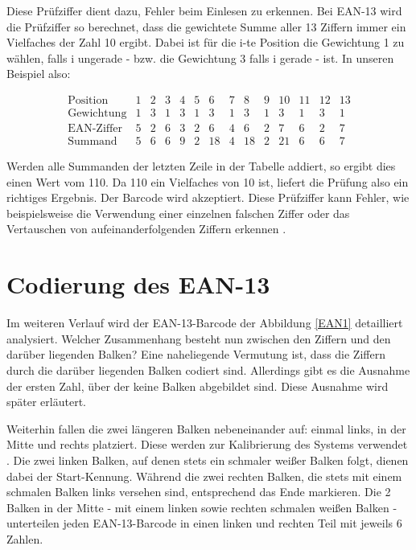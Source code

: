 Diese Prüfziffer dient dazu, Fehler beim Einlesen zu erkennen. 
Bei EAN-13 wird die Prüfziffer so berechnet, 
dass die gewichtete Summe aller 13 Ziffern immer ein Vielfaches der Zahl 10 ergibt.
Dabei ist für die i-te Position die Gewichtung 1 zu wählen, falls i ungerade - bzw. die Gewichtung 3 falls i gerade - ist. 
In unseren Beispiel also:

\[
\begin{array}{l|r|r|r|r|r|r|r|r|r|r|r|r|r}
    \mbox{Position}		&   1 &   2 &   3 &   4 &   5 &    6 &   7 &    8 &   9 &  10 &  11 &  12 & 13  \\ \hline
    \mbox{Gewichtung}	&   1 &   3 &   1 &   3 &   1 &    3 &   1 &    3 &   1 &   3 &  1  &   3 &  1  \\ \hline
    \mbox{EAN-Ziffer}	&   5 &   2 &   6 &   3 &   2 &    6 &   4 &    6 &   2 &   7 &  6  &   2 &  7  \\ \hline
    \mbox{Summand}		&   5 &   6 &   6 &   9 &   2 &   18 &   4 &   18 &   2 &  21 &  6  &   6 &  7 
\end{array}
\]

Werden alle Summanden der letzten Zeile in der Tabelle addiert, so ergibt dies einen Wert vom 110. Da 110 ein Vielfaches von 10 ist,
liefert die Prüfung also ein richtiges Ergebnis. Der Barcode wird akzeptiert.
Diese Prüfziffer kann Fehler, wie beispielsweise die Verwendung einer einzelnen falschen Ziffer 
oder das Vertauschen von aufeinanderfolgenden Ziffern erkennen \cite[S. 10 - 11]{Stammbach:2015}.

\section{Codierung des EAN-13} \label{CE}

Im weiteren Verlauf wird der EAN-13-Barcode der Abbildung \ref{EAN1} \linebreak 
detailliert analysiert.
Welcher Zusammenhang besteht nun zwischen den Ziffern und den darüber liegenden Balken? 
Eine naheliegende Ver\-mutung ist, dass die Ziffern durch die darüber liegenden Balken codiert sind. 
Allerdings gibt es die Ausnahme der ersten Zahl, über der keine Balken abgebildet sind. 
Diese Ausnahme wird später erläutert. 

Weiterhin fallen die zwei längeren Balken nebeneinander auf: einmal links, in der Mitte und rechts platziert.
Diese werden zur Kalibrierung des Systems verwendet \cite{Stammbach:2015}. 
Die zwei linken Balken, auf denen stets ein schmaler weißer Balken folgt, dienen dabei der Start-Kennung. 
Während die zwei rechten Balken, die stets mit einem schmalen Balken links \linebreak 
versehen sind,  entsprechend das Ende markieren.
Die 2 Balken in der Mitte - mit einem linken sowie rechten schmalen weißen Balken \linebreak
- unterteilen 
jeden EAN-13-Barcode in einen linken und rechten Teil mit jeweils 6 Zahlen. 

